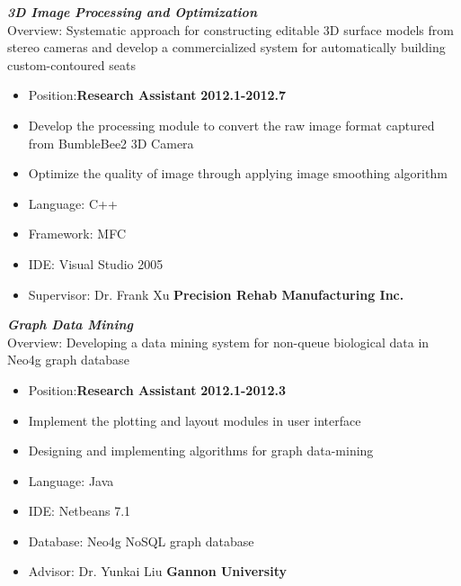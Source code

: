 \documentclass[margin]{res}
\begin{document}
\begin{resume}
	{\sl \textbf{3D Image Processing and Optimization}}\\
		Overview: Systematic approach for constructing editable 3D surface models from stereo cameras and develop a commercialized system for automatically building custom-contoured seats
		\begin{itemize}
			\item Position:\textbf{Research Assistant} \hfill \textbf{2012.1-2012.7}
			\item Develop the processing module to convert the raw image format captured from BumbleBee2 3D Camera
			\item Optimize the quality of image through applying image smoothing algorithm
			\item Language: C++
			\item Framework: MFC
			\item IDE: Visual Studio 2005
			\item Supervisor: Dr. Frank Xu \hfill \textbf{Precision Rehab Manufacturing Inc.}
		\end {itemize}
	{\sl \textbf{Graph Data Mining}}\\
		Overview: Developing a data mining system for non-queue biological data in Neo4g graph database 
		\begin{itemize}
			\item Position:\textbf{Research Assistant} \hfill \textbf{2012.1-2012.3}
			\item Implement the plotting and layout modules in user interface
			\item Designing and implementing algorithms for graph data-mining
			\item Language: Java
			\item IDE: Netbeans 7.1
			\item Database: Neo4g NoSQL graph database
			\item Advisor: Dr. Yunkai Liu \hfill \textbf{Gannon University} 
		\end {itemize}


\end{resume}
\end{document}
